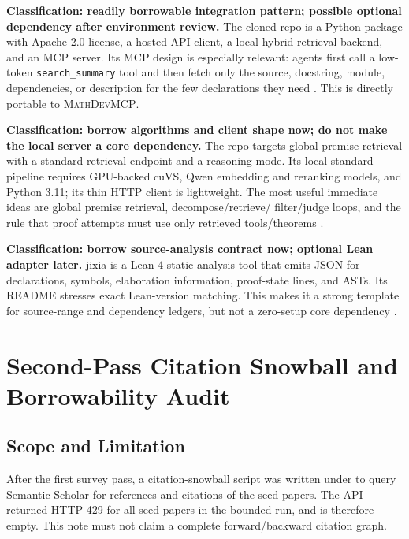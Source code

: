 \documentclass[11pt]{article}
\newcommand{\MathDevMCP}{\textsc{MathDevMCP}}
\begin{document}
\begin{description}[style=nextline,leftmargin=0pt]
\item[LeanExplore.] \textbf{Classification: readily borrowable integration
pattern; possible optional dependency after environment review.} The cloned
repo is a Python package with Apache-2.0 license, a hosted API client, a local
hybrid retrieval backend, and an MCP server. Its MCP design is especially
relevant: agents first call a low-token \texttt{search\_summary} tool and then
fetch only the source, docstring, module, dependencies, or description for the
few declarations they need \cite{asher2025leanexplore}. This is directly
portable to \MathDevMCP{}.

\item[LeanSearch-v2.] \textbf{Classification: borrow algorithms and client
shape now; do not make the local server a core dependency.} The repo targets
global premise retrieval with a standard retrieval endpoint and a reasoning
mode. Its local standard pipeline requires GPU-backed cuVS, Qwen embedding and
reranking models, and Python 3.11; its thin HTTP client is lightweight. The
most useful immediate ideas are global premise retrieval, decompose/retrieve/
filter/judge loops, and the rule that proof attempts must use only retrieved
tools/theorems \cite{gao2026leansearchv2}.

\item[jixia.] \textbf{Classification: borrow source-analysis contract now;
optional Lean adapter later.} jixia is a Lean 4 static-analysis tool that emits
JSON for declarations, symbols, elaboration information, proof-state lines, and
ASTs. Its README stresses exact Lean-version matching. This makes it a strong
template for source-range and dependency ledgers, but not a zero-setup core
dependency \cite{jixiagithub}.
\end{description}

\section{Second-Pass Citation Snowball and Borrowability Audit}

\subsection{Scope and Limitation}

After the first survey pass, a citation-snowball script was written under
 to query Semantic
Scholar for references and citations of the seed papers. The API returned HTTP
429 for all seed papers in the bounded run, and
 is therefore empty. This note must not claim a
complete forward/backward citation graph.
\end{document}
